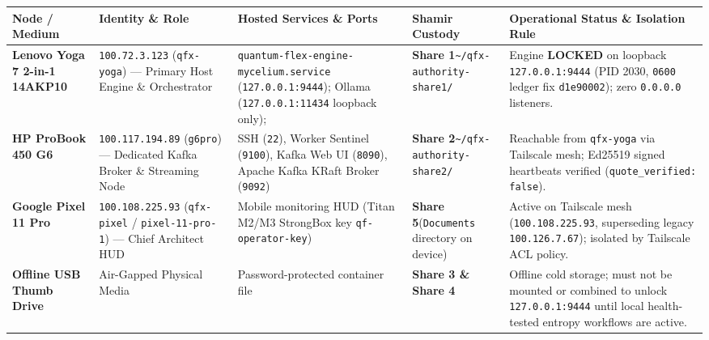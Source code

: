 \documentclass[10pt,letterpaper]{article}
\begin{document}
\vspace{6pt}\noindent\begin{minipage}{\textwidth}
\centering
{}
\vspace{2pt}
\footnotesize
\begin{tabularx}{\textwidth}{L{2.5cm} L{2.6cm} L{4.2cm} L{3.1cm} Y}
\toprule
\textbf{Node / Medium} & \textbf{Identity \& Role} & \textbf{Hosted Services \& Ports} & \textbf{Shamir Custody} & \textbf{Operational Status \& Isolation Rule} \\
\midrule
\textbf{Lenovo Yoga 7 2-in-1 14AKP10} & \texttt{100.72.3.123} (\texttt{qfx-yoga}) --- Primary Host Engine \& Orchestrator & \texttt{quantum-flex-engine-}\newline\texttt{mycelium.service} (\texttt{127.0.0.1:9444}); Ollama (\texttt{127.0.0.1:11434} loopback only);  & \textbf{Share 1}\newline\texttt{\textasciitilde/qfx-authority-}\newline\texttt{share1/} & Engine \textbf{LOCKED} on loopback \texttt{127.0.0.1:9444} (PID 2030, \texttt{0600} ledger fix \texttt{d1e90002}); zero \texttt{0.0.0.0} listeners. \\
\textbf{HP ProBook 450 G6} & \texttt{100.117.194.89} (\texttt{g6pro}) --- Dedicated Kafka Broker \& Streaming Node & SSH (\texttt{22}), Worker Sentinel (\texttt{9100}), Kafka Web UI (\texttt{8090}), Apache Kafka KRaft Broker (\texttt{9092}) & \textbf{Share 2}\newline\texttt{\textasciitilde/qfx-authority-}\newline\texttt{share2/} & Reachable from \texttt{qfx-yoga} via Tailscale mesh; Ed25519 signed heartbeats verified (\texttt{quote\_verified: false}). \\
\textbf{Google Pixel 11 Pro} & \texttt{100.108.225.93} (\texttt{qfx-pixel} / \texttt{pixel-11-pro-1}) --- Chief Architect HUD & Mobile monitoring HUD (Titan M2/M3 StrongBox key \texttt{qf-operator-key}) & \textbf{Share 5}\newline(\texttt{Documents} directory on device) & Active on Tailscale mesh (\texttt{100.108.225.93}, superseding legacy \texttt{100.126.7.67}); isolated by Tailscale ACL policy. \\
\textbf{Offline USB Thumb Drive} & Air-Gapped Physical Media & Password-protected container file & \textbf{Share 3 \& Share 4} & Offline cold storage; must not be mounted or combined to unlock \texttt{127.0.0.1:9444} until local health-tested entropy workflows are active. \\
\bottomrule
\end{tabularx}
\end{minipage}\vspace{6pt}
\end{document}
